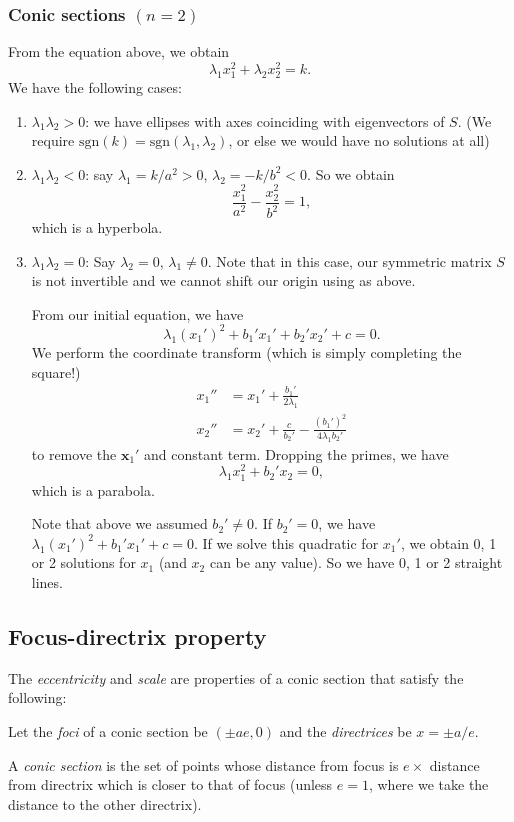 \documentclass[a4paper]{article}
\begin{document}
      \subsubsection{Conic sections \texorpdfstring{$(n = 2)$}{(n = 2)}}
      From the equation above, we obtain
      \[
        \lambda_1x_1^2 + \lambda_2x_2^2 = k.
      \]
      We have the following cases:
      \begin{enumerate}
        \item $\lambda_1\lambda_2 > 0$: we have ellipses with axes coinciding with eigenvectors of $S$. (We require $\mathrm{sgn}(k) = \mathrm{sgn}(\lambda_1,\lambda_2)$, or else we would have no solutions at all)
        \item $\lambda_1\lambda_2 < 0$: say $\lambda_1 = k/a^2 > 0$, $\lambda_2 = -k/b^2 < 0$. So we obtain
          \[
            \frac{x_1^2}{a^2} - \frac{x_2^2}{b^2} = 1,
          \]
          which is a hyperbola.
        \item $\lambda_1\lambda_2 = 0$: Say $\lambda_2 = 0$, $\lambda_1\not= 0$. Note that in this case, our symmetric matrix $S$ is not invertible and we cannot shift our origin using as above.

          From our initial equation, we have
          \[
            \lambda_1(x_1')^2 + b_1'x_1' + b_2' x_2' + c = 0.
          \]
          We perform the coordinate transform (which is simply completing the square!)
          \begin{align*}
            x_1'' &= x_1' + \frac{b_1'}{2\lambda_1}\\
            x_2'' &= x_2' + \frac{c}{b_2'} - \frac{(b_1')^2}{4\lambda_1b_2'}
          \end{align*}
          to remove the $\mathbf{x}_1'$ and constant term. Dropping the primes, we have
          \[
            \lambda_1 x_1^2 + b_2' x_2 = 0,
          \]
          which is a parabola.

          Note that above we assumed $b_2'\not= 0$. If $b_2' = 0$, we have $\lambda_1(x_1')^2 + b_1' x_1' + c = 0$. If we solve this quadratic for $x_1'$, we obtain 0, 1 or 2 solutions for $x_1$ (and $x_2$ can be any value). So we have 0, 1 or 2 straight lines.
      \end{enumerate}

      \subsection{Focus-directrix property}
      \begin{defi}
        The \emph{eccentricity} and \emph{scale} are properties of a conic section that satisfy the following:

        Let the \emph{foci} of a conic section be $(\pm ae, 0)$ and the \emph{directrices} be $x = \pm a/e$.

        A \emph{conic section} is the set of points whose distance from focus is $e \times$ distance from directrix which is closer to that of focus (unless $e = 1$, where we take the distance to the other directrix).
      \end{defi}
\end{document}
